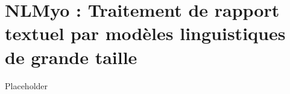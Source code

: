 \chapter{NLMyo : Traitement de rapport textuel par modèles linguistiques de grande taille}
Placeholder